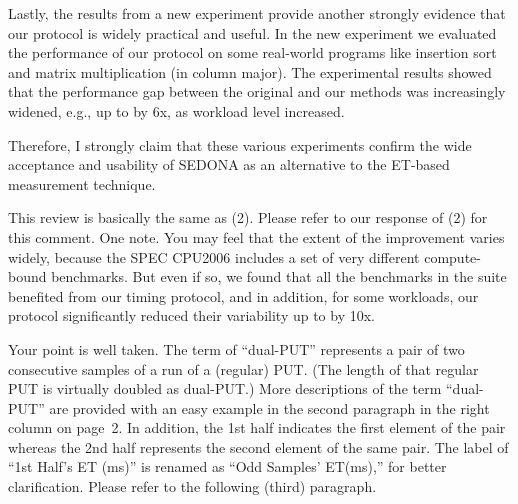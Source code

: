 \documentclass[10pt,letterpaper]{article}
\newenvironment{myindentpar}[1]%
{\begin{list}{}
         {\vspace{10pt}
					\setlength{\leftmargin}{#1}}
          \item[]
}
{\end{list}}
\newcommand{\rev}[1]{\begin{myindentpar}{.25in} {\em {\color{blue}{#1}}}\end{myindentpar}}
\begin{document}
Lastly, the results from a new experiment provide 
another strongly evidence that our protocol is widely practical and useful. 
In the new experiment we evaluated the performance of our protocol 
on some real-world programs like insertion sort and matrix multiplication (in column major). 
The experimental results showed that the performance gap between the original and our methods 
was increasingly widened, e.g., up to by 6x, as workload level increased. 

Therefore, I strongly claim that these various experiments confirm 
the wide acceptance and usability of SEDONA as an alternative to the ET-based measurement technique. 

\rev{ 
(3) The improvement of the SEDONA is little. And the extent of the each
benchmark’s improvement described in Table 3 varies widely. Thus, the
experimental results does not confirm whether the SEDONA is widely
practical or is useful.
}

This review is basically the same as (2). Please refer to our response of (2) for this comment. 
One note. You may feel that the extent of the improvement varies widely, 
because the SPEC CPU2006 includes a set of very different compute-bound benchmarks. 
But even if so, we found that all the benchmarks in the suite benefited from our timing protocol, 
and in addition, for some workloads, our protocol significantly reduced their variability up to by 10x.  


\rev{ 
(4) Since the explanation of ``dual-PUT'' is not enough, I can not well
understand the algorithm shown in Fig. 3. Similarly, what is “1st
Half’s ET (ms)” attached at Fig. 4(b), 4(c), 4(d) ? I understood only that
the label is related with “dual-PUT”. These words are important in the
manuscript. So, please keep in mind to write understandably.
}

Your point is well taken. 
The term of ``dual-PUT'' represents 
a pair of two consecutive samples of a run of a (regular) PUT. 
(The length of that regular PUT is virtually doubled as dual-PUT.) More descriptions of the term ``\hbox{dual-PUT}'' are provided with an easy example 
in the second paragraph in the right column on page~2. 
In addition, the 1st half indicates the first element of the pair 
whereas the 2nd half represents the second element of the same pair. 
The label of ``1st Half's ET (ms)'' is renamed as ``Odd Samples' ET(ms),'' 
for better clarification. Please refer to the following (third) paragraph. 
\end{document}
